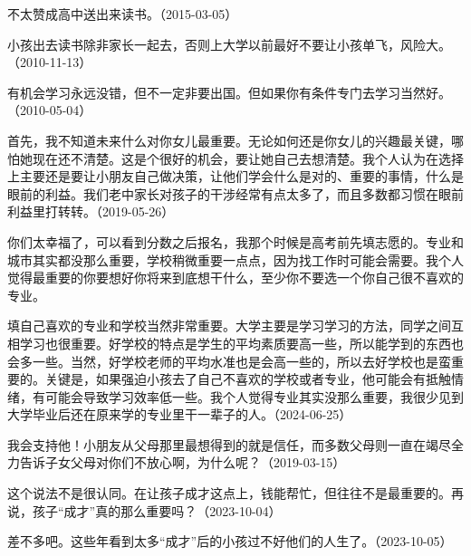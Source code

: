 不太赞成高中送出来读书。（2015-03-05）

小孩出去读书除非家长一起去，否则上大学以前最好不要让小孩单飞，风险大。（2010-11-13）


有机会学习永远没错，但不一定非要出国。但如果你有条件专门去学习当然好。（2010-05-04）


首先，我不知道未来什么对你女儿最重要。无论如何还是你女儿的兴趣最关键，哪怕她现在还不清楚。这是个很好的机会，要让她自己去想清楚。我个人认为在选择上主要还是要让小朋友自己做决策，让他们学会什么是对的、重要的事情，什么是眼前的利益。我们老中家长对孩子的干涉经常有点太多了，而且多数都习惯在眼前利益里打转转。（2019-05-26）


你们太幸福了，可以看到分数之后报名，我那个时候是高考前先填志愿的。专业和城市其实都没那么重要，学校稍微重要一点点，因为找工作时可能会需要。我个人觉得最重要的你要想好你将来到底想干什么，至少你不要选一个你自己很不喜欢的专业。

填自己喜欢的专业和学校当然非常重要。大学主要是学习学习的方法，同学之间互相学习也很重要。好学校的特点是学生的平均素质要高一些，所以能学到的东西也会多一些。当然，好学校老师的平均水准也是会高一些的，所以去好学校也是蛮重要的。关键是，如果强迫小孩去了自己不喜欢的学校或者专业，他可能会有抵触情绪，有可能会导致学习效率低一些。我个人觉得专业其实没那么重要，我很少见到大学毕业后还在原来学的专业里干一辈子的人。（2024-06-25）


我会支持他！小朋友从父母那里最想得到的就是信任，而多数父母则一直在竭尽全力告诉子女父母对你们不放心啊，为什么呢？（2019-03-15）


这个说法不是很认同。在让孩子成才这点上，钱能帮忙，但往往不是最重要的。再说，孩子“成才”真的那么重要吗？（2023-10-04）


差不多吧。这些年看到太多“成才”后的小孩过不好他们的人生了。（2023-10-05）

